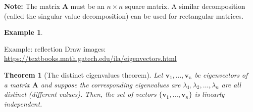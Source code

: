 \documentclass[
]{book}
\newtheorem{theorem}{Theorem}[chapter]
\theoremstyle{definition}
\theoremstyle{definition}
\newtheorem{example}{Example}[chapter]
\theoremstyle{definition}
\theoremstyle{remark}
\begin{document}
\textbf{Note:} The matrix \(\mathbf{A}\) must be an \(n \times n\) square matrix. A similar decomposition (called the singular value decomposition) can be used for rectangular matrices.

\begin{example}
\protect\hypertarget{exm:unlabeled-div-160}{}\label{exm:unlabeled-div-160}

Example: reflection
Draw images: \url{https://textbooks.math.gatech.edu/ila/eigenvectors.html}

\end{example}

\begin{theorem}[The distinct eigenvalues theorem]
\protect\hypertarget{thm:distinct-eigenvalues}{}{\label{thm:distinct-eigenvalues} {} }Let \(\mathbf{v}_1, \ldots, \mathbf{v}_n\) be eigenvectors of a matrix \(\mathbf{A}\) and suppose the corresponding eigenvalues are \(\lambda_1, \lambda_2, \ldots, \lambda_n\) are all distinct (different values). Then, the set of vectors \(\{\mathbf{v}_1, \ldots, \mathbf{v}_n\}\) is linearly independent.
\end{theorem}
\end{document}
